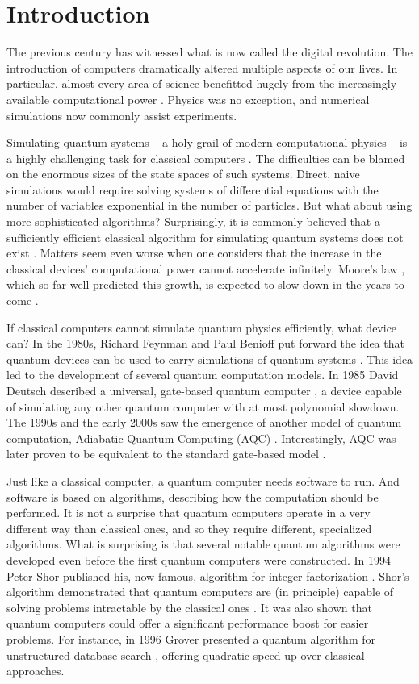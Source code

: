\chapter{Introduction}
The previous century has witnessed what is now called the digital revolution.
The introduction of computers dramatically altered multiple aspects of our
lives. In particular, almost every area of science benefitted hugely from the
increasingly available computational power \cite{winsberg}. Physics was no
exception, and numerical simulations now commonly assist experiments.

Simulating quantum systems -- a holy grail of modern computational physics --
is a highly challenging task for classical computers \cite{feynman.82}. The
difficulties can be blamed on the enormous sizes of the state spaces of such
systems. Direct, naive simulations would require solving systems of
differential equations with the number of variables exponential in the number
of particles. But what about using more sophisticated algorithms? Surprisingly,
it is commonly believed that a sufficiently efficient classical algorithm for
simulating quantum systems does not exist \cite{feynman.82, poplavskii}.
Matters seem even worse when one considers that the increase in the classical
devices' computational power cannot accelerate infinitely. Moore's law
\cite{mack}, which so far well predicted this growth, is expected to slow down
in the years to come \cite{waldrop, kumar}.

If classical computers cannot simulate quantum physics efficiently, what device
can? In the 1980s, Richard Feynman and Paul Benioff put forward the idea that
quantum devices can be used to carry simulations of quantum systems
\cite{feynman.82,benioff.80}. This idea led to the development of several
quantum computation models. In 1985 David Deutsch described a universal,
gate-based quantum computer \cite{deutsch}, a device capable of simulating any
other quantum computer with at most polynomial slowdown. The 1990s and the
early 2000s saw the emergence of another model of quantum computation,
Adiabatic Quantum Computing (AQC) \cite{kadowaki,farhi}. Interestingly, AQC was
later proven to be equivalent to the standard gate-based model \cite{aharonov}.

Just like a classical computer, a quantum computer needs software to run. And
software is based on algorithms, describing how the computation should be
performed. It is not a surprise that quantum computers operate in a very
different way than classical ones, and so they require different, specialized
algorithms. What is surprising is that several notable quantum algorithms were
developed even before the first quantum computers were constructed. In 1994
Peter Shor published his, now famous, algorithm for integer factorization
\cite{shor}. Shor's algorithm demonstrated that quantum computers are (in
principle) capable of solving problems intractable by the classical ones
\cite{kleinjung}. It was also shown that quantum computers could offer a
significant performance boost for easier problems. For instance, in 1996 Grover
presented a quantum algorithm for unstructured database search \cite{grover},
offering quadratic speed-up over classical approaches.

